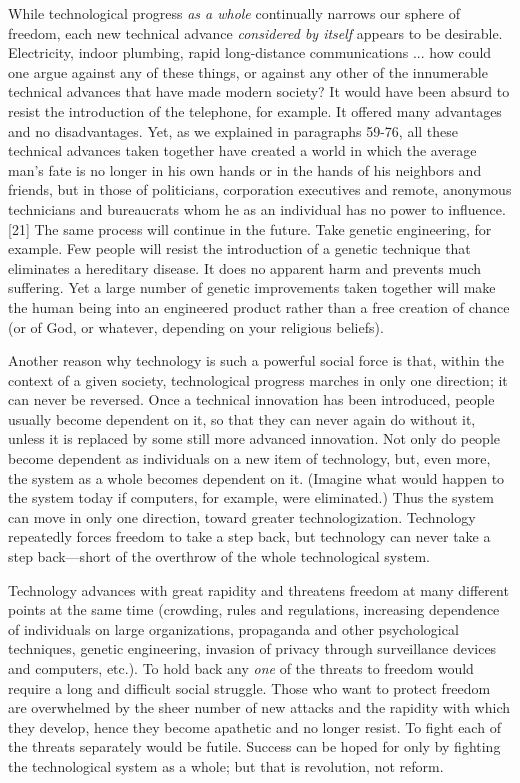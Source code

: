  While technological progress {\em as a whole} continually narrows our sphere of freedom, each new technical advance {\em considered by itself} appears to be desirable. Electricity, indoor plumbing, rapid long-distance communications ... how could one argue against any of these things, or against any other of the innumerable technical advances that have made modern society? It would have been absurd to resist the introduction of the telephone, for example. It offered many advantages and no disadvantages. Yet, as we explained in paragraphs 59-76, all these technical advances taken together have created a world in which the average man’s fate is no longer in his own hands or in the hands of his neighbors and friends, but in those of politicians, corporation executives and remote, anonymous technicians and bureaucrats whom he as an individual has no power to influence. [21] The same process will continue in the future. Take genetic engineering, for example. Few people will resist the introduction of a genetic technique that eliminates a hereditary disease. It does no apparent harm and prevents much suffering. Yet a large number of genetic improvements taken together will make the human being into an engineered product rather than a free creation of chance (or of God, or whatever, depending on your religious beliefs).

 Another reason why technology is such a powerful social force is that, within the context of a given society, technological progress marches in only one direction; it can never be reversed. Once a technical innovation has been introduced, people usually become dependent on it, so that they can never again do without it, unless it is replaced by some still more advanced innovation. Not only do people become dependent as individuals on a new item of technology, but, even more, the system as a whole becomes dependent on it. (Imagine what would happen to the system today if computers, for example, were eliminated.) Thus the system can move in only one direction, toward greater technologization. Technology repeatedly forces freedom to take a step back, but technology can never take a step back—short of the overthrow of the whole technological system.

 Technology advances with great rapidity and threatens freedom at many different points at the same time (crowding, rules and regulations, increasing dependence of individuals on large organizations, propaganda and other psychological techniques, genetic engineering, invasion of privacy through surveillance devices and computers, etc.). To hold back any {\em one} of the threats to freedom would require a long and difficult social struggle. Those who want to protect freedom are overwhelmed by the sheer number of new attacks and the rapidity with which they develop, hence they become apathetic and no longer resist. To fight each of the threats separately would be futile. Success can be hoped for only by fighting the technological system as a whole; but that is revolution, not reform.

